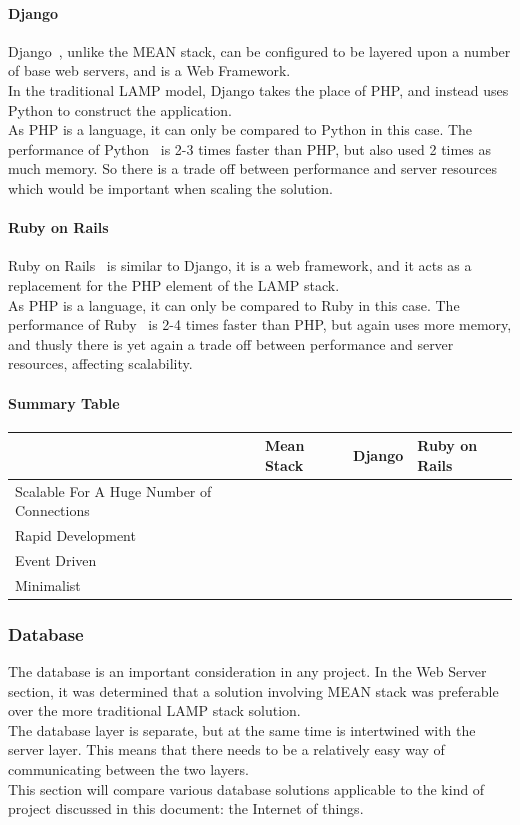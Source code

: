 \documentclass[draft,preprint,12pt,3p]{elsarticle}
\newcommand{\checkmark}{\ding{51}}%
\newcommand{\xmark}{\ding{55}}%
\begin{document}
\paragraph{Django}
Django~\cite{django}, unlike the MEAN stack, can be configured to be layered upon a number of base web servers, and is a Web Framework.\\
In the traditional LAMP model, Django takes the place of PHP, and instead uses Python to construct the application.\\
As PHP is a language, it can only be compared to Python in this case. The performance of Python~\cite{djangovsphp} is 2-3 times faster than PHP, but also used 2 times as much memory. So there is a trade off between performance and server resources which would be important when scaling the solution.

\paragraph{Ruby on Rails}
Ruby on Rails~\cite{ruby} is similar to Django, it is a web framework, and it acts as a replacement for the PHP element of the LAMP stack.\\
As PHP is a language, it can only be compared to Ruby in this case. The performance of Ruby~\cite{rubyvsphp} is 2-4 times faster than PHP, but again uses more memory, and thusly there is yet again a trade off between performance and server resources, affecting scalability.

\paragraph{Summary Table}
\begin{tabular}{| l | l | l | l |}
    \hline
          & Mean Stack & Django & Ruby on Rails \\ \hline
    Scalable For A Huge Number of Connections & \checkmark & \xmark & \xmark\\ \hline
    Rapid Development & \checkmark & \checkmark & \checkmark\\ \hline
    Event Driven & \checkmark & \xmark & \xmark\\ \hline
    Minimalist & \checkmark & \xmark & \xmark\\ \hline
\end{tabular}


\subsubsection{Database}
The database is an important consideration in any project. In the Web Server section, it was determined that a solution involving MEAN stack was preferable over the more traditional LAMP stack solution.\\
The database layer is separate, but at the same time is intertwined with the server layer. This means that there needs to be a relatively easy way of communicating between the two layers.\\
This section will compare various database solutions applicable to the kind of project discussed in this document: the Internet of things.\\
\end{document}
